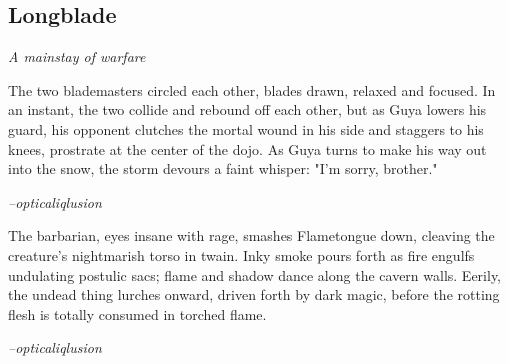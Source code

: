 \subsection{Longblade}
\textit{A mainstay of warfare}

\begin{quotebox}
The two blademasters circled each other, blades drawn, relaxed and focused. In an instant, the two collide and rebound off each other, but as Guya lowers his guard, his opponent clutches the mortal wound in his side and staggers to his knees, prostrate at the center of the dojo. As Guya turns to make his way out into the snow, the storm devours a faint whisper: "I'm sorry, brother."

	\textit{--opticaliqlusion}
\end{quotebox}

\begin{quotebox}
The barbarian, eyes insane with rage, smashes Flametongue down, cleaving the creature's nightmarish torso in twain. Inky smoke pours forth as fire engulfs undulating postulic sacs; flame and shadow dance along the cavern walls. Eerily, the undead thing lurches onward, driven forth by dark magic, before the rotting flesh is totally consumed in torched flame.

	\textit{--opticaliqlusion}
\end{quotebox}
